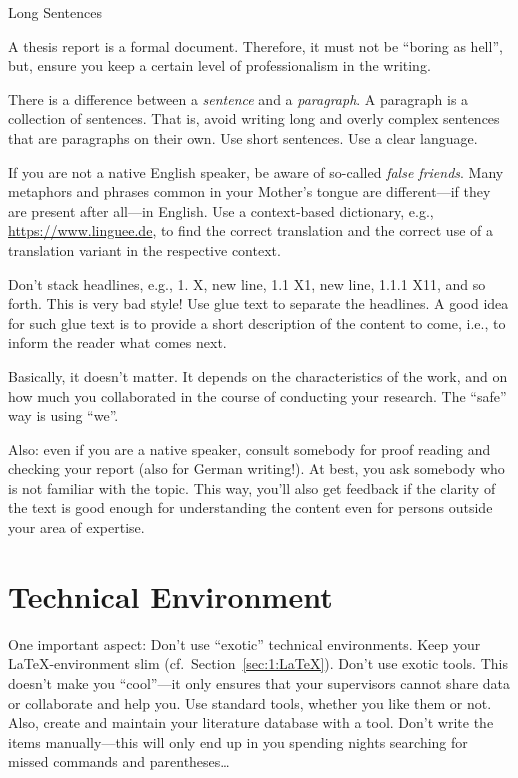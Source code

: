 \begin{labeling}{Long Sentences}
	\item[No Slang] A thesis report is a formal document. Therefore, it must not be ``boring as hell'', but, ensure you keep a certain level of professionalism in the writing.
	\item[Long Sentences] There is a difference between a \emph{sentence} and a \emph{paragraph}. A paragraph is  a collection of sentences. That is, avoid writing long and overly complex sentences that are paragraphs on their own. Use short sentences. Use a clear language.
	\item[False Friends] If you are not a native English speaker, be aware of so-called \emph{false friends}. Many metaphors and phrases common in your Mother's tongue are different---if they are present after all---in English. Use a context-based dictionary, e.g., \url{https://www.linguee.de}, to find the correct translation and the correct use of a translation variant in the respective context.
	\item[Stacking] Don't stack headlines, e.g., 1. X, new line, 1.1 X1, new line, 1.1.1 X11, and so forth. This is very bad style! Use glue text to separate the headlines. A good idea for such glue text is to provide a short description of the content to come, i.e., to inform the reader what comes next.
	\item[We or I] Basically, it doesn't matter. It depends on the characteristics of the work, and on how much you collaborated in the course of conducting your research. The ``safe'' way is using ``we''.
\end{labeling}
Also: even if you are a native speaker, consult somebody for proof reading and checking your report (also for German writing!). At best, you ask somebody who is not familiar with the topic. This way, you'll also get feedback if the clarity of the text is good enough for understanding the content even for persons outside your area of expertise.

\section{Technical Environment}
\label{sec:03:TechnicalEnvironment}
One important aspect: Don't use ``exotic'' technical environments. Keep your \LaTeX-environment slim (cf.\ Section~\ref{sec:1:LaTeX}). Don't use exotic tools. This doesn't make you ``cool''---it only ensures that your supervisors cannot share data or collaborate and help you. Use standard tools, whether you like them or not. Also, create and maintain your literature database with a tool. Don't write the items manually---this will only end up in you spending nights searching for missed commands and parentheses\ldots

